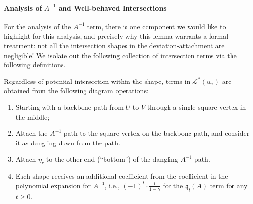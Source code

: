 \documentclass[12pt]{article}
\newtheorem{definition}[theorem]{Definition}
\newcommand{\q}{\mathfrak q}
\begin{document}

\paragraph{Analysis of $A^{-1}$ and Well-behaved Intersections} For the analysis of the $A^{-1}$ term, there is one component we would like to highlight for this analysis, and precisely why this lemma warrants a formal treatment: not all the intersection shapes in the deviation-attachment are negligible! We isolate out the following collection of intersection terms via the following definitions. 


Regardless of potential intersection within the shape, terms in $\mathcal{L}^*(w_\tau)$ are obtained from the following diagram operations:
\begin{enumerate}
	\item Starting with a backbone-path from $U$ to $V$ through a single square vertex in the middle;
	\item Attach the $A^{-1}$-path to the square-vertex on the backbone-path, and consider it as dangling down from the path.
	\item Attach $\eta_\tau$ to the other end (``bottom'') of the dangling $A^{-1}$-path.
	\item Each shape receives an additional coefficient from the coefficient in the polynomial expansion for $A^{-1}$, i.e., $(-1)^t \cdot \frac{1}{1-\gamma}$ for the $\q_t(A)$ term for any $t\geq 0$.  
\end{enumerate}
\end{document}
